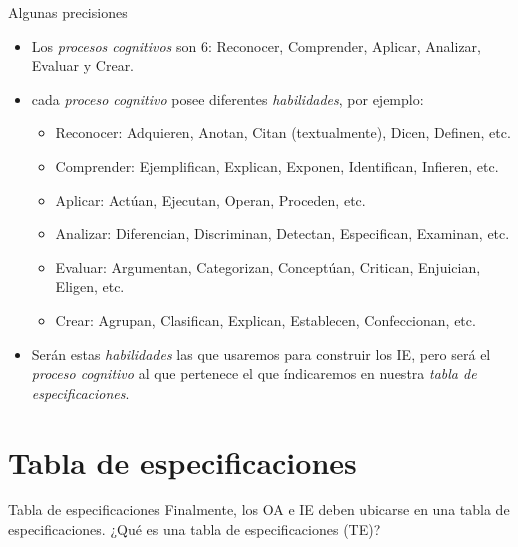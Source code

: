 \documentclass[11pt, aspectratio=169, xcolor=table,hyphens]{beamer}
\begin{document}
\begin{frame}{Algunas precisiones}

	\begin{itemize}[<+->]
		\item Los \emph{procesos cognitivos} son 6: Reconocer, Comprender, Aplicar, Analizar, Evaluar y Crear.
		\item cada \emph{proceso cognitivo} posee diferentes \textit{habilidades}, por ejemplo:
		      \begin{itemize}
			      \item Reconocer: Adquieren, Anotan, Citan (textualmente), Dicen, Definen, etc.
			      \item Comprender: Ejemplifican, Explican, Exponen, Identifican, Infieren, etc.
			      \item Aplicar:  Actúan, Ejecutan, Operan, Proceden, etc.
			      \item Analizar: Diferencian, Discriminan, Detectan, Especifican, Examinan, etc.
			      \item Evaluar: Argumentan, Categorizan, Conceptúan, Critican, Enjuician, Eligen, etc.
			      \item Crear: Agrupan, Clasifican, Explican, Establecen, Confeccionan, etc.
		      \end{itemize}
		\item Serán estas \textit{habilidades} las que usaremos para construir los IE, pero será el \emph{proceso cognitivo} al que pertenece el que índicaremos en nuestra \textit{tabla de especificaciones}.
	\end{itemize}
\end{frame}

\section{Tabla de especificaciones}

\begin{frame}{Tabla de especificaciones \cite{CASTILLO2010}}
	Finalmente, los OA e IE deben ubicarse en una tabla de especificaciones. ¿Qué es una tabla de especificaciones (TE)?
	\begin{center}
		
	\end{center}
\end{frame}
\end{document}
